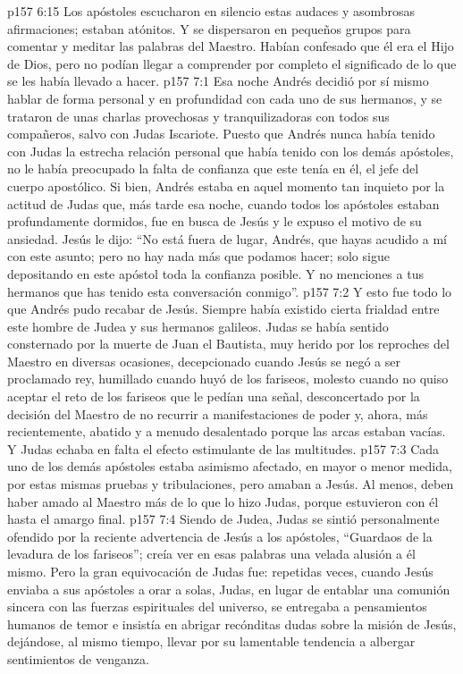 \vs p157 6:15 \pc Los apóstoles escucharon en silencio estas audaces y asombrosas afirmaciones; estaban atónitos. Y se dispersaron en pequeños grupos para comentar y meditar las palabras del Maestro. Habían confesado que él era el Hijo de Dios, pero no podían llegar a comprender por completo el significado de lo que se les había llevado a hacer.
\vs p157 7:1 Esa noche Andrés decidió por sí mismo hablar de forma personal y en profundidad con cada uno de sus hermanos, y se trataron de unas charlas provechosas y tranquilizadoras con todos sus compañeros, salvo con Judas Iscariote. Puesto que Andrés nunca había tenido con Judas la estrecha relación personal que había tenido con los demás apóstoles, no le había preocupado la falta de confianza que este tenía en él, el jefe del cuerpo apostólico. Si bien, Andrés estaba en aquel momento tan inquieto por la actitud de Judas que, más tarde esa noche, cuando todos los apóstoles estaban profundamente dormidos, fue en busca de Jesús y le expuso el motivo de su ansiedad. Jesús le dijo: “No está fuera de lugar, Andrés, que hayas acudido a mí con este asunto; pero no hay nada más que podamos hacer; solo sigue depositando en este apóstol toda la confianza posible. Y no menciones a tus hermanos que has tenido esta conversación conmigo”.
\vs p157 7:2 Y esto fue todo lo que Andrés pudo recabar de Jesús. Siempre había existido cierta frialdad entre este hombre de Judea y sus hermanos galileos. Judas se había sentido consternado por la muerte de Juan el Bautista, muy herido por los reproches del Maestro en diversas ocasiones, decepcionado cuando Jesús se negó a ser proclamado rey, humillado cuando huyó de los fariseos, molesto cuando no quiso aceptar el reto de los fariseos que le pedían una señal, desconcertado por la decisión del Maestro de no recurrir a manifestaciones de poder y, ahora, más recientemente, abatido y a menudo desalentado porque las arcas estaban vacías. Y Judas echaba en falta el efecto estimulante de las multitudes.
\vs p157 7:3 Cada uno de los demás apóstoles estaba asimismo afectado, en mayor o menor medida, por estas mismas pruebas y tribulaciones, pero amaban a Jesús. Al menos, deben haber amado al Maestro más de lo que lo hizo Judas, porque estuvieron con él hasta el amargo final.
\vs p157 7:4 Siendo de Judea, Judas se sintió personalmente ofendido por la reciente advertencia de Jesús a los apóstoles, “Guardaos de la levadura de los fariseos”; creía ver en esas palabras una velada alusión a él mismo. Pero la gran equivocación de Judas fue: repetidas veces, cuando Jesús enviaba a sus apóstoles a orar a solas, Judas, en lugar de entablar una comunión sincera con las fuerzas espirituales del universo, se entregaba a pensamientos humanos de temor e insistía en abrigar recónditas dudas sobre la misión de Jesús, dejándose, al mismo tiempo, llevar por su lamentable tendencia a albergar sentimientos de venganza.
